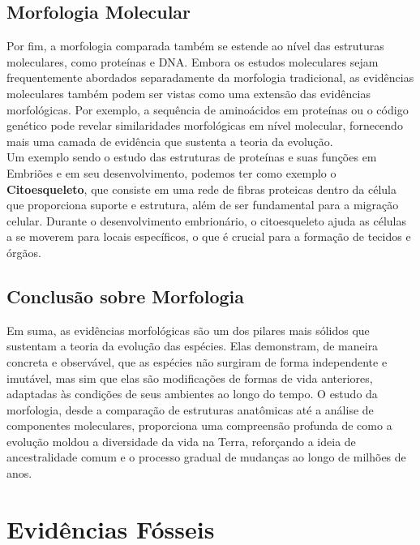 \documentclass{report}
\begin{document}
\subsection{Morfologia Molecular}\label{subsec.fosseis2.6}

Por fim, a morfologia comparada também se estende ao nível das estruturas moleculares, como proteínas e DNA. Embora os estudos moleculares sejam frequentemente abordados separadamente da morfologia tradicional, as evidências moleculares também podem ser vistas como uma extensão das evidências morfológicas. Por exemplo, a sequência de aminoácidos em proteínas ou o código genético pode revelar similaridades morfológicas em nível molecular, fornecendo mais uma camada de evidência que sustenta a teoria da evolução.\\

Um exemplo sendo o estudo das estruturas de proteínas e suas funções em Embriões e em seu desenvolvimento, podemos ter como exemplo o \textbf{Citoesqueleto}, que consiste em uma rede de fibras proteicas dentro da célula que proporciona suporte e estrutura, além de ser fundamental para a migração celular. Durante o desenvolvimento embrionário, o citoesqueleto ajuda as células a se moverem para locais específicos, o que é crucial para a formação de tecidos e órgãos.

\subsection{Conclusão sobre Morfologia}\label{subsec.fosseis2.7}

Em suma, as evidências morfológicas são um dos pilares mais sólidos que sustentam a teoria da evolução das espécies. Elas demonstram, de maneira concreta e observável, que as espécies não surgiram de forma independente e imutável, mas sim que elas são modificações de formas de vida anteriores, adaptadas às condições de seus ambientes ao longo do tempo. O estudo da morfologia, desde a comparação de estruturas anatômicas até a análise de componentes moleculares, proporciona uma compreensão profunda de como a evolução moldou a diversidade da vida na Terra, reforçando a ideia de ancestralidade comum e o processo gradual de mudanças ao longo de milhões de anos.\\

\section{Evidências Fósseis}\label{sec.fosseis3}
\end{document}
